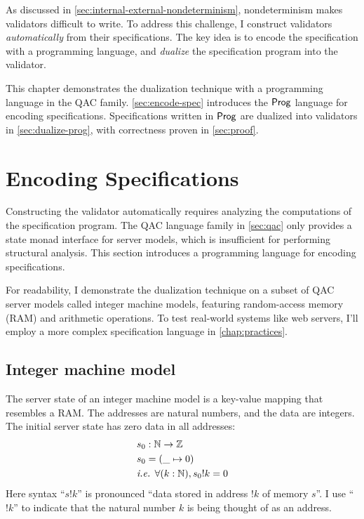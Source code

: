 As discussed in \autoref{sec:internal-external-nondeterminism}, nondeterminism
makes validators difficult to write.  To address this challenge, I construct
validators {\em automatically} from their specifications.  The key idea is to
encode the specification with a programming language, and {\em dualize} the
specification program into the validator.

This chapter demonstrates the dualization technique with a programming language
in the QAC family.  \autoref{sec:encode-spec} introduces the $\mathsf{Prog}$ language
for encoding specifications.  Specifications written in $\mathsf{Prog}$ are dualized into
validators in \autoref{sec:dualize-prog}, with correctness proven in
\autoref{sec:proof}.

\section{Encoding Specifications}
\label{sec:encode-spec}
Constructing the validator automatically requires analyzing the computations of
the specification program.  The QAC language family in \autoref{sec:qac} only
provides a state monad interface for server models, which is insufficient for
performing structural analysis.  This section introduces a programming language
for encoding specifications.

For readability, I demonstrate the dualization technique on a subset of QAC
server models called integer machine models, featuring random-access memory (RAM)
and arithmetic operations.  To test real-world systems like web servers, I'll
employ a more complex specification language in \autoref{chap:practices}.

\subsection{Integer machine model}
The server state of an integer machine model is a key-value mapping that
resembles a RAM.  The addresses are natural numbers, and the data are integers.
The initial server state has zero data in all addresses:
\begin{align*}
  &s_0:\mathbb N\to\mathbb Z\\
  &s_0=(\_\mapsto0)\\
  &\textit{i.e. }\forall (k:\mathbb N), s_0!k=0
\end{align*}
Here syntax ``$s!k$'' is pronounced ``data stored in address $!k$ of memory
$s$''.  I use ``$!k$'' to indicate that the natural number $k$ is being thought
of as an address.

